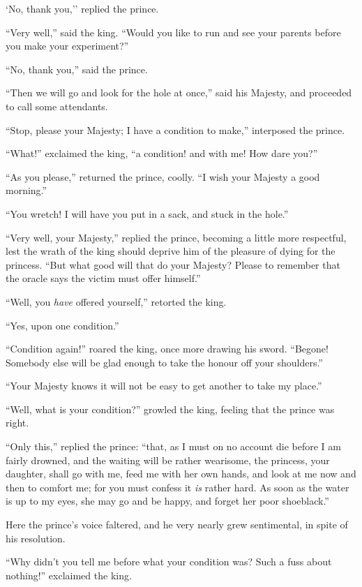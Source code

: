 \documentclass[12pt]{memoir}
\begin{document}
`No, thank you,'' replied the prince.

``Very well,'' said the king.  ``Would you like to run and see your
parents before you make your experiment?''

``No, thank you,'' said the prince.

``Then we will go and look for the hole at once,'' said his Majesty,
and proceeded to call some attendants.

``Stop, please your Majesty; I have a condition to make,'' interposed
the prince.

``What!'' exclaimed the king, ``a condition! and with me!  How dare
you?''

``As you please,'' returned the prince, coolly.  ``I wish your Majesty
a good morning.''

``You wretch!  I will have you put in a sack, and stuck in the hole.''

``Very well, your Majesty,'' replied the prince, becoming a little
more respectful, lest the wrath of the king should deprive him of the
pleasure of dying for the princess.  ``But what good will that do your
Majesty?  Please to remember that the oracle says the victim must
offer himself.''

``Well, you \emph{have} offered yourself,'' retorted the king.

``Yes, upon one condition.''

``Condition again!'' roared the king, once more drawing his sword.
``Begone!  Somebody else will be glad enough to take the honour off
your shoulders.''

``Your Majesty knows it will not be easy to get another to take my
place.''

``Well, what is your condition?'' growled the king, feeling that the
prince was right.

``Only this,'' replied the prince: ``that, as I must on no account die
before I am fairly drowned, and the waiting will be rather wearisome,
the princess, your daughter, shall go with me, feed me with her own
hands, and look at me now and then to comfort me; for you must confess
it \emph{is} rather hard.  As soon as the water is up to my eyes, she
may go and be happy, and forget her poor shoeblack.''

Here the prince's voice faltered, and he very nearly grew sentimental,
in spite of his resolution.

``Why didn't you tell me before what your condition was?  Such a fuss
about nothing!'' exclaimed the king.
\end{document}
